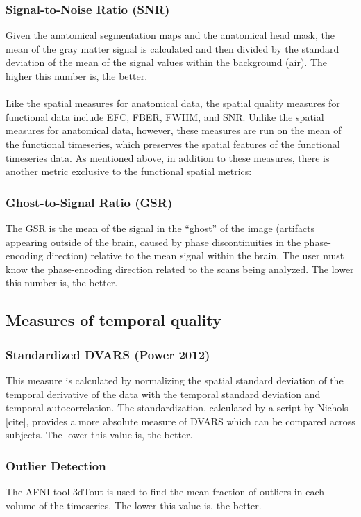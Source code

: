 \subsubsection{Signal-to-Noise Ratio (SNR)}
\label{sec:9}
Given the anatomical segmentation maps and the anatomical head mask, the mean of the gray matter signal is calculated and then divided by the standard deviation of the mean of the signal values within the background (air). The higher this number is, the better.
\\\\
Like the spatial measures for anatomical data, the spatial quality measures for functional data include EFC, FBER, FWHM, and SNR. Unlike the spatial measures for anatomical data, however, these measures are run on the mean of the functional timeseries, which preserves the spatial features of the functional timeseries data. As mentioned above, in addition to these measures, there is another metric exclusive to the functional spatial metrics:
\subsubsection{Ghost-to-Signal Ratio (GSR)}
\label{sec:10}
The GSR is the mean of the signal in the “ghost” of the image (artifacts appearing outside of the brain, caused by phase discontinuities in the phase-encoding direction) relative to the mean signal within the brain. The user must know the phase-encoding direction related to the scans being analyzed. The lower this number is, the better.
\subsection{Measures of temporal quality}
\label{sec:11}
\subsubsection{Standardized DVARS (Power 2012)}
\label{sec:12}
This measure is calculated by normalizing the spatial standard deviation of the temporal derivative of the data with the temporal standard deviation and temporal autocorrelation. The standardization, calculated by a script by Nichols [cite], provides a more absolute measure of DVARS which can be compared across subjects. The lower this value is, the better.
\subsubsection{Outlier Detection}
\label{sec:13}
The AFNI tool 3dTout is used to find the mean fraction of outliers in each volume of the timeseries. The lower this value is, the better.
